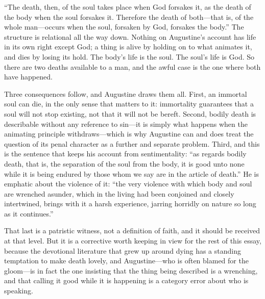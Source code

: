 ``The death, then, of the soul takes place when God forsakes it, as the death of the body when the soul forsakes it. Therefore the death of both---that is, of the whole man---occurs when the soul, forsaken by God, forsakes the body.'' The structure is relational all the way down. Nothing on Augustine's account has life in its own right except God; a thing is alive by holding on to what animates it, and dies by losing its hold. The body's life is the soul. The soul's life is God. So there are two deaths available to a man, and the awful case is the one where both have happened.

Three consequences follow, and Augustine draws them all. First, an immortal soul can die, in the only sense that matters to it: immortality guarantees that a soul will not stop existing, not that it will not be bereft. Second, bodily death is describable without any reference to sin---it is simply what happens when the animating principle withdraws---which is why Augustine can and does treat the question of its penal character as a further and separate problem. Third, and this is the sentence that keeps his account from sentimentality: ``as regards bodily death, that is, the separation of the soul from the body, it is good unto none while it is being endured by those whom we say are in the article of death.'' He is emphatic about the violence of it: ``the very violence with which body and soul are wrenched asunder, which in the living had been conjoined and closely intertwined, brings with it a harsh experience, jarring horridly on nature so long as it continues.''

That last is a patristic witness, not a definition of faith, and it should be received at that level. But it is a corrective worth keeping in view for the rest of this essay, because the devotional literature that grew up around dying has a standing temptation to make death lovely, and Augustine---who is often blamed for the gloom---is in fact the one insisting that the thing being described is a wrenching, and that calling it good while it is happening is a category error about who is speaking.

